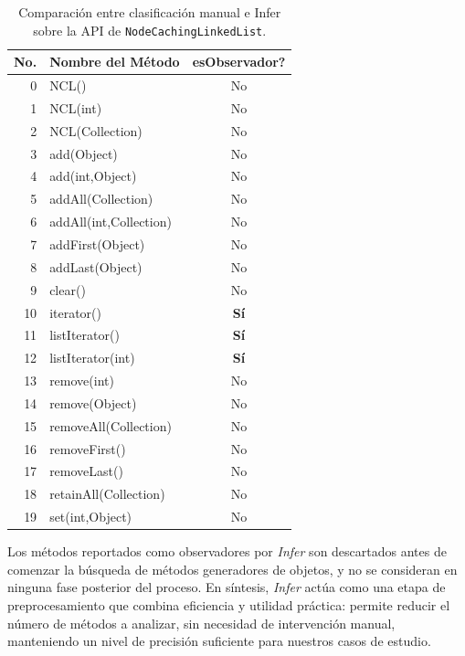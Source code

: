 \begin{table}[h!]
\centering
{\scriptsize
\begin{tabular}{|r|l|c|}
\hline
No. & Nombre del Método & esObservador? \\
\hline
0 & NCL() & No \\
1 & NCL(int) & No \\
2 & NCL(Collection) & No \\
3 & add(Object) & No \\
4 & add(int,Object) & No \\
5 & addAll(Collection) & No \\
6 & addAll(int,Collection) & No \\
7 & addFirst(Object) & No \\
8 & addLast(Object) & No \\
9 & clear() & No \\
10 & iterator() & \textbf{Sí} \\
11 & listIterator() & \textbf{Sí} \\
12 & listIterator(int) & \textbf{Sí} \\
13 & remove(int) & No \\
14 & remove(Object) & No \\
15 & removeAll(Collection) & No \\
16 & removeFirst() & No \\
17 & removeLast() & No \\
18 & retainAll(Collection) & No \\
19 & set(int,Object) & No \\
\hline
\end{tabular}
}
\caption{Comparación entre clasificación manual e Infer sobre la API de \texttt{NodeCachingLinkedList}.}
\label{tab:ncl-infer-comparacion}
\end{table}


Los métodos reportados como observadores por \emph{Infer} son descartados antes de comenzar la búsqueda de métodos generadores de objetos, y no se consideran en ninguna fase posterior del proceso.
En síntesis, \emph{Infer} actúa como una etapa de preprocesamiento que combina eficiencia y utilidad práctica: permite reducir el número de métodos a analizar, sin necesidad de intervención manual, manteniendo un nivel de precisión suficiente para nuestros casos de estudio.




